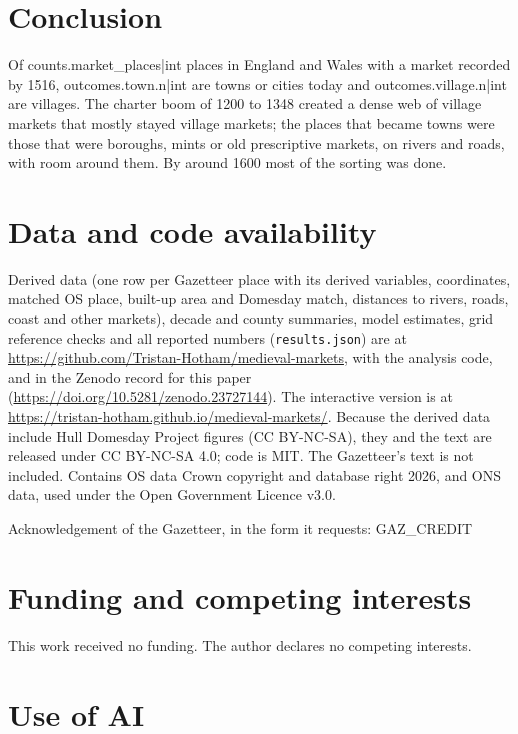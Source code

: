 \documentclass[11pt,a4paper]{article}
\begin{document}
\section{Conclusion}

Of {{counts.market_places|int}} places in England and Wales with a market recorded by 1516, {{outcomes.town.n|int}} are towns or cities today and {{outcomes.village.n|int}} are villages. The charter boom of 1200 to 1348 created a dense web of village markets that mostly stayed village markets; the places that became towns were those that were boroughs, mints or old prescriptive markets, on rivers and roads, with room around them. By around 1600 most of the sorting was done.

\section*{Data and code availability}

Derived data (one row per Gazetteer place with its derived variables, coordinates, matched OS place, built-up area and Domesday match, distances to rivers, roads, coast and other markets), decade and county summaries, model estimates, grid reference checks and all reported numbers (\texttt{results.json}) are at \url{https://github.com/Tristan-Hotham/medieval-markets}, with the analysis code, and in the Zenodo record for this paper (\url{https://doi.org/10.5281/zenodo.23727144}). The interactive version is at \url{https://tristan-hotham.github.io/medieval-markets/}. Because the derived data include Hull Domesday Project figures (CC BY-NC-SA), they and the text are released under CC BY-NC-SA 4.0; code is MIT. The Gazetteer's text is not included. Contains OS data \textcopyright{} Crown copyright and database right 2026, and ONS data, used under the Open Government Licence v3.0.

Acknowledgement of the Gazetteer, in the form it requests: {{GAZ_CREDIT}}

\section*{Funding and competing interests}

This work received no funding. The author declares no competing interests.

\section*{Use of AI}
\end{document}
